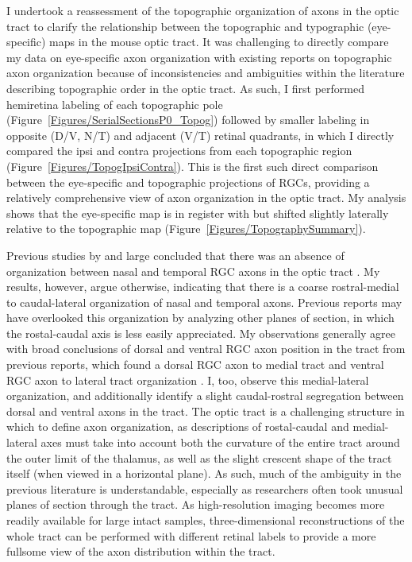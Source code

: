 I undertook a reassessment of the topographic organization of axons in the optic tract to clarify the relationship between the topographic and typographic (eye-specific) maps in the mouse optic tract.
It was challenging to directly compare my data on eye-specific axon organization with existing reports on topographic axon organization because of inconsistencies and ambiguities within the literature describing topographic order in the optic tract.
As such, I first performed hemiretina labeling of each topographic pole (Figure~\ref{Figures/SerialSectionsP0_Topog}) followed by smaller labeling in opposite (D/V, N/T) and adjacent (V/T) retinal quadrants, in which I directly compared the ipsi and contra projections from each topographic region (Figure~\ref{Figures/TopogIpsiContra}).
This is the first such direct comparison between the eye-specific and topographic projections of RGCs, providing a relatively comprehensive view of axon organization in the optic tract.
My analysis shows that the eye-specific map is in register with but shifted slightly laterally relative to the topographic map (Figure~\ref{Figures/TopographySummary}).

Previous studies by and large concluded that there was an absence of organization between nasal and temporal RGC axons in the optic tract \cite{chan1994changes,plas2005pretarget,reese1993reestablishment}.
My results, however, argue otherwise, indicating that there is a coarse rostral-medial to caudal-lateral organization of nasal and temporal axons.
Previous reports may have overlooked this organization by analyzing other planes of section, in which the rostal-caudal axis is less easily appreciated.
My observations generally agree with broad conclusions of dorsal and ventral RGC axon position in the tract from previous reports, which found a dorsal RGC axon to medial tract and ventral RGC axon to lateral tract organization \cite{chan1999changes,chan1994changes,plas2005pretarget,reese1993reestablishment,reese1990fibre,reh1983organization,torrealba1982studies}.%
I, too, observe this medial-lateral organization, and additionally identify a slight caudal-rostral segregation between dorsal and ventral axons in the tract.
The optic tract is a challenging structure in which to define axon organization, as descriptions of rostal-caudal and medial-lateral axes must take into account both the curvature of the entire tract around the outer limit of the thalamus, as well as the slight crescent shape of the tract itself (when viewed in a horizontal plane).
As such, much of the ambiguity in the previous literature is understandable, especially as researchers often took unusual planes of section through the tract.
As high-resolution imaging becomes more readily available for large intact samples, three-dimensional reconstructions of the whole tract can be performed with different retinal labels to provide a more fullsome view of the axon distribution within the tract.

